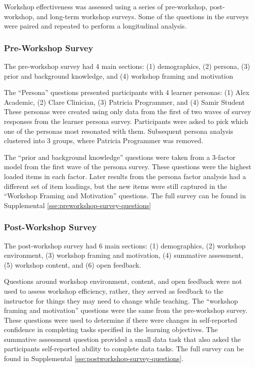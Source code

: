 \documentclass[030-workshop.tex]{subfiles}
\begin{document}
    Workshop effectiveness was assessed using a series of pre-workshop, post-workshop, and long-term workshop surveys.
    Some of the questions in the surveys were paired and repeated to perform a longitudinal analysis.

  \subsubsection{Pre-Workshop Survey}

      The pre-workshop survey had 4 main sections:
      (1) demographics,
      (2) persona,
      (3) prior and background knowledge, and
      (4) workshop framing and motivation

      The ``Persona'' questions presented participants with 4 learner personas:
      (1) Alex Academic,
      (2) Clare Clinician,
      (3) Patricia Programmer, and
      (4) Samir Student
      These personas were created using only data from the first of two waves of survey responses from the learner persona survey.
      Participants were asked to pick which one of the personas most resonated with them.
      Subsequent persona analysis clustered into 3 groups, where Patricia Programmer was removed.

      The ``prior and background knowledge'' questions were taken from
      a 3-factor model from the first wave of the persona survey. %
      These questions were the highest loaded items in each factor.
      Later results from the persona factor analysis had a different set of item loadings,
      but the new items were still captured in the ``Workshop Framing and Motivation'' questions.
      The full survey can be found in
      Supplemental \ref{sse:preworkshop-survey-questions}

  \subsubsection{Post-Workshop Survey}

      The post-workshop survey had 6 main sections:
      (1) demographics,
      (2) workshop environment,
      (3) workshop framing and motivation,
      (4) summative assessment,
      (5) workshop content, and
      (6) open feedback.

      Questions around workshop environment, content, and open feedback
      were not used to assess workshop efficiency,
      rather, they served as feedback to the instructor for things they may need to change while teaching.
      The ``workshop framing and motivation'' questions were the same from the pre-workshop survey.
      These questions were used to determine if there were changes in self-reported confidence in
      completing tasks specified in the learning objectives.
      The summative assessment question provided a small data task that also asked
      the participants self-reported ability to complete data tasks.
      The full survey can be found in Supplemental \ref{sse:postworkshop-survey-questions}.
\end{document}
